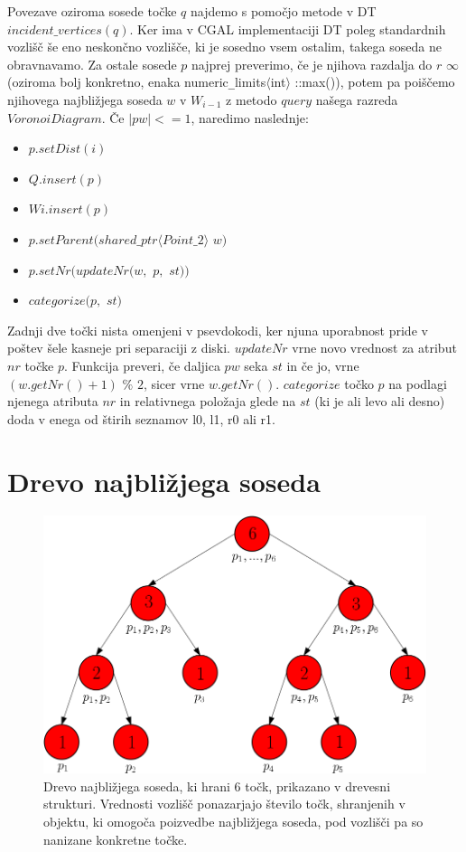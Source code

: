 \documentclass[a4paper, 12pt]{book}
\begin{document}
Povezave oziroma sosede točke $q$ najdemo s pomočjo metode v DT \\ $incident\texttt{\_}vertices(q)$. Ker ima v CGAL implementaciji DT poleg standardnih vozlišč še eno neskončno vozlišče, ki je sosedno vsem ostalim, takega soseda ne obravnavamo. Za ostale sosede $p$ najprej preverimo, če je njihova razdalja do $r$ $\infty$ (oziroma bolj konkretno, enaka numeric\texttt{\_}limits$\langle$int$\rangle$ ::max()), potem pa poiščemo njihovega najbližjega soseda $w$ v $W_{i-1}$ z metodo $query$ našega razreda $VoronoiDiagram$. Če $|pw| <= 1$, naredimo naslednje:

\begin{itemize}
\item $p.setDist(i)$
\item $Q.insert(p)$
\item $Wi.insert(p)$
\item $p.setParent(shared\texttt{\_}ptr\langle Point\texttt{\_}2\rangle  $ $w)$
\item $p.setNr(updateNr(w,$ $p,$ $st))$
\item $categorize(p,$ $st)$
\end{itemize}

Zadnji dve točki nista omenjeni v psevdokodi, ker njuna uporabnost pride v poštev šele kasneje pri separaciji z diski. $updateNr$ vrne novo vrednost za atribut $nr$ točke $p$. Funkcija preveri, če daljica $pw$ seka $st$ in če jo, vrne $(w.getNr() + 1)$ $\%$ $2$, sicer vrne $w.getNr()$. $categorize$ točko $p$ na podlagi njenega atributa $nr$ in relativnega položaja glede na $st$ (ki je ali levo ali desno) doda v enega od štirih seznamov l0, l1, r0 ali r1.

\section{Drevo najbližjega soseda}

\begin{figure}
\centerline{\includegraphics[scale=0.5]{pics/nntree-png.png}}
\caption{Drevo najbližjega soseda, ki hrani 6 točk, prikazano v drevesni strukturi. Vrednosti vozlišč ponazarjajo število točk, shranjenih v objektu, ki omogoča poizvedbe najbližjega soseda, pod vozlišči pa so nanizane konkretne točke.}
\label{nntree}
\end{figure}
\end{document}
